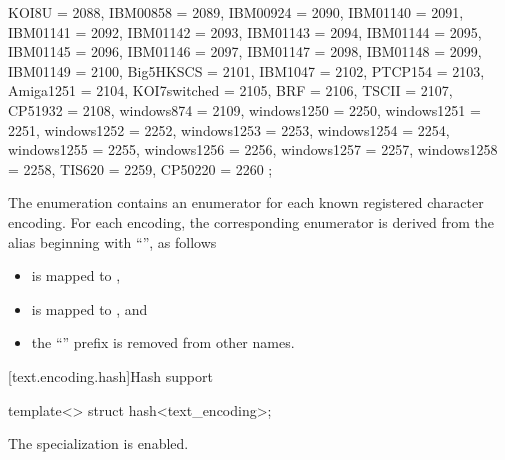 \begin{codeblock}
{{    KOI8U = 2088,
    IBM00858 = 2089,
    IBM00924 = 2090,
    IBM01140 = 2091,
    IBM01141 = 2092,
    IBM01142 = 2093,
    IBM01143 = 2094,
    IBM01144 = 2095,
    IBM01145 = 2096,
    IBM01146 = 2097,
    IBM01147 = 2098,
    IBM01148 = 2099,
    IBM01149 = 2100,
    Big5HKSCS = 2101,
    IBM1047 = 2102,
    PTCP154 = 2103,
    Amiga1251 = 2104,
    KOI7switched = 2105,
    BRF = 2106,
    TSCII = 2107,
    CP51932 = 2108,
    windows874 = 2109,
    windows1250 = 2250,
    windows1251 = 2251,
    windows1252 = 2252,
    windows1253 = 2253,
    windows1254 = 2254,
    windows1255 = 2255,
    windows1256 = 2256,
    windows1257 = 2257,
    windows1258 = 2258,
    TIS620 = 2259,
    CP50220 = 2260
  };
}
\end{codeblock}

\begin{note}
The  enumeration
contains an enumerator for each known registered character encoding.
For each encoding, the corresponding enumerator is derived from
the alias beginning with ``'', as follows
\begin{itemize}
\item
{} is mapped to ,
\item
{} is mapped to , and
\item
the ``'' prefix is removed from other names.
\end{itemize}
\end{note}

[text.encoding.hash]{Hash support}

%
\begin{itemdecl}
template<> struct hash<text_encoding>;
\end{itemdecl}

\begin{itemdescr}
\pnum
The specialization is enabled.
\end{itemdescr}
